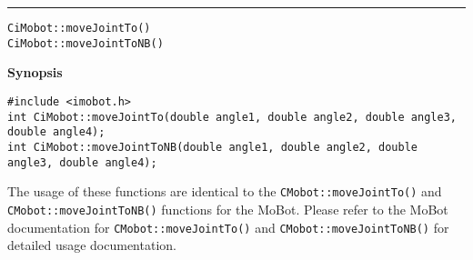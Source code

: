 \noindent
\vspace{5pt}
\rule{6.5in}{0.015in}
\noindent
{\LARGE \texttt{CiMobot::moveJointTo()}}\\
{\LARGE \texttt{CiMobot::moveJointToNB()}}\\
{}

\noindent
{\bf Synopsis}\\
\begin{verbatim}
#include <imobot.h>
int CiMobot::moveJointTo(double angle1, double angle2, double angle3, double angle4);
int CiMobot::moveJointToNB(double angle1, double angle2, double angle3, double angle4);
\end{verbatim}

The usage of these functions are identical to the
\texttt{CMobot::moveJointTo()} and \texttt{CMobot::moveJointToNB()} functions for the MoBot.
Please refer to the MoBot documentation for \texttt{CMobot::moveJointTo()} and
\texttt{CMobot::moveJointToNB()} for
detailed usage documentation.

